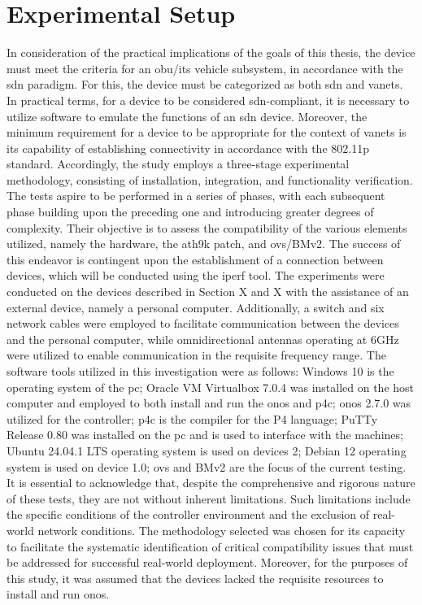 \section{Experimental Setup}
In consideration of the practical implications of the goals of this thesis, the device must meet the criteria for an \gls{obu}/\gls{its} vehicle subsystem, in accordance with the \gls{sdn} paradigm. For this, the device must be categorized as both \gls{sdn} and \glspl{vanet}. In practical terms, for a device to be considered \gls{sdn}-compliant, it is necessary to utilize software to emulate the functions of an \gls{sdn} device. Moreover, the minimum requirement for a device to be appropriate for the context of \glspl{vanet} is its capability of establishing connectivity in accordance with the 802.11p standard.
Accordingly, the study employs a three-stage experimental methodology, consisting of installation, integration, and functionality verification. The tests aspire to be performed in a series of phases, with each subsequent phase building upon the preceding one and introducing greater degrees of complexity. Their objective is to assess the compatibility of the various elements utilized, namely the hardware, the ath9k patch, and \gls{ovs}/BMv2. The success of this endeavor is contingent upon the establishment of a connection between devices, which will be conducted using the iperf tool.
The experiments were conducted on the devices described in Section X and X with the assistance of an external device, namely a personal computer. Additionally, a switch and six network cables were employed to facilitate communication between the devices and the personal computer, while omnidirectional antennas operating at 6GHz were utilized to enable communication in the requisite frequency range.
The software tools utilized in this investigation were as follows:
Windows 10 is the operating system of the \gls{pc};
Oracle VM Virtualbox 7.0.4 was installed on the host computer and employed to both install and run the \gls{onos} and p4c;
\gls{onos} 2.7.0 was utilized for the controller;
p4c is the compiler for the P4 language;
PuTTy Release 0.80 was installed on the \gls{pc} and is used to interface with the machines;
Ubuntu 24.04.1 LTS operating system is used on devices 2;
Debian 12 operating system is used on device 1.0;
\gls{ovs} and BMv2 are the focus of the current testing.
It is essential to acknowledge that, despite the comprehensive and rigorous nature of these tests, they are not without inherent limitations. Such limitations include the specific conditions of the controller environment and the exclusion of real-world network conditions. The methodology selected was chosen for its capacity to facilitate the systematic identification of critical compatibility issues that must be addressed for successful real-world deployment. Moreover, for the purposes of this study, it was assumed that the devices lacked the requisite resources to install and run \gls{onos}.


